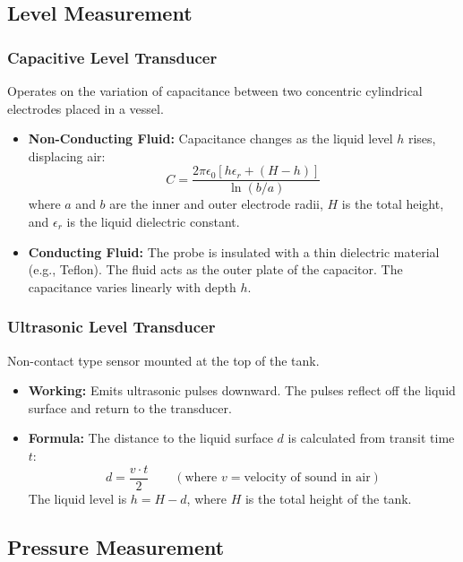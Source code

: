 \documentclass[12pt,a4paper]{article}
\begin{document}
\subsection{Level Measurement}
\subsubsection{Capacitive Level Transducer}
Operates on the variation of capacitance between two concentric cylindrical electrodes placed in a vessel.
\begin{itemize}[leftmargin=*, itemsep=3pt]
  \item \textbf{Non-Conducting Fluid:} Capacitance changes as the liquid level $h$ rises, displacing air:
  \begin{equation}
    C = \frac{2\pi\epsilon_0 [h\epsilon_r + (H - h)]}{\ln(b/a)}
  \end{equation}
  where $a$ and $b$ are the inner and outer electrode radii, $H$ is the total height, and $\epsilon_r$ is the liquid dielectric constant.
  \item \textbf{Conducting Fluid:} The probe is insulated with a thin dielectric material (e.g., Teflon). The fluid acts as the outer plate of the capacitor. The capacitance varies linearly with depth $h$.
\end{itemize}


\subsubsection{Ultrasonic Level Transducer}
Non-contact type sensor mounted at the top of the tank.
\begin{itemize}[leftmargin=*, itemsep=3pt]
  \item \textbf{Working:} Emits ultrasonic pulses downward. The pulses reflect off the liquid surface and return to the transducer.
  \item \textbf{Formula:} The distance to the liquid surface $d$ is calculated from transit time $t$:
  \begin{equation}
    d = \frac{v \cdot t}{2} \qquad (\text{where } v = \text{velocity of sound in air})
  \end{equation}
  The liquid level is $h = H - d$, where $H$ is the total height of the tank.
\end{itemize}


\subsection{Pressure Measurement}
\end{document}
